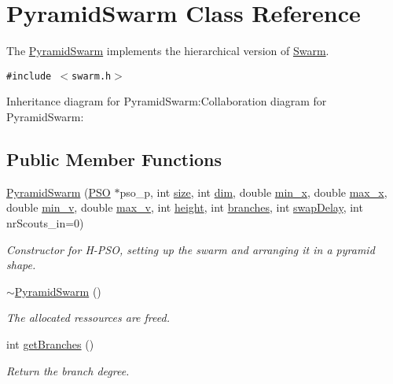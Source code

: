 \hypertarget{classPyramidSwarm}{
\section{PyramidSwarm Class Reference}
\label{classPyramidSwarm}
}
The \hyperlink{classPyramidSwarm}{PyramidSwarm} implements the hierarchical version of \hyperlink{classSwarm}{Swarm}.  


{\tt \#include $<$swarm.h$>$}

Inheritance diagram for PyramidSwarm:Collaboration diagram for PyramidSwarm:\subsection*{Public Member Functions}
\begin{CompactItemize}
\item 
\hyperlink{classPyramidSwarm_300ed83e7f46ecf8895d5ab8a0bb7ad8}{PyramidSwarm} (\hyperlink{classPSO}{PSO} $\ast$pso\_\-p, int \hyperlink{runpso_8cpp_439227feff9d7f55384e8780cfc2eb82}{size}, int \hyperlink{runpso_8cpp_70b5e28b5bc3d1b63a7435c5fe50b837}{dim}, double \hyperlink{classSwarm_b504e23c39413573e3685a88435f5f85}{min\_\-x}, double \hyperlink{classSwarm_e5075d21be96c1cdf441bc2b612177c1}{max\_\-x}, double \hyperlink{classSwarm_160c79397ea811636e17c0e4d6297729}{min\_\-v}, double \hyperlink{classSwarm_2b0dbde2c275f991580a07a745cb5ade}{max\_\-v}, int \hyperlink{classPyramidSwarm_147496f1f506ee3f2e82cadc9c235baf}{height}, int \hyperlink{classPyramidSwarm_b60c66cd8c7437c9b9abb2016a65e824}{branches}, int \hyperlink{classPyramidSwarm_b45f85f201faea37d41695fe4d3cae04}{swapDelay}, int nrScouts\_\-in=0)
\begin{CompactList}\small\item\em Constructor for H-PSO, setting up the swarm and arranging it in a pyramid shape. \item\end{CompactList}\item 
\hyperlink{classPyramidSwarm_bf3027f08a160137dc7d8a12727a28eb}{$\sim$PyramidSwarm} ()
\begin{CompactList}\small\item\em The allocated ressources are freed. \item\end{CompactList}\item 
int \hyperlink{classPyramidSwarm_9372ad747da64c8f3fd904da02c36d41}{getBranches} ()
\begin{CompactList}\small\item\em Return the branch degree. \item\end{CompactList}\item 

\end{CompactItemize}
